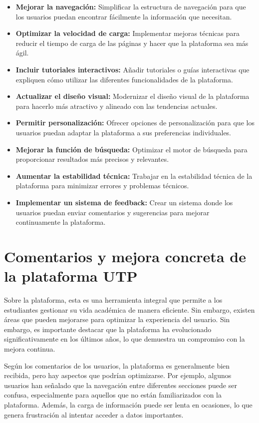 \documentclass{article}
\begin{document}
\begin{itemize}
  \item \textbf{Mejorar la navegación:} Simplificar la estructura de navegación para que los usuarios puedan encontrar fácilmente la información que necesitan.
  \item \textbf{Optimizar la velocidad de carga:} Implementar mejoras técnicas para reducir el tiempo de carga de las páginas y hacer que la plataforma sea más ágil.
  \item \textbf{Incluir tutoriales interactivos:} Añadir tutoriales o guías interactivas que expliquen cómo utilizar las diferentes funcionalidades de la plataforma.
  \item \textbf{Actualizar el diseño visual:} Modernizar el diseño visual de la plataforma para hacerlo más atractivo y alineado con las tendencias actuales.
  \item \textbf{Permitir personalización:} Ofrecer opciones de personalización para que los usuarios puedan adaptar la plataforma a sus preferencias individuales.
  \item \textbf{Mejorar la función de búsqueda:} Optimizar el motor de búsqueda para proporcionar resultados más precisos y relevantes.
  \item \textbf{Aumentar la estabilidad técnica:} Trabajar en la estabilidad técnica de la plataforma para minimizar errores y problemas técnicos.
  \item \textbf{Implementar un sistema de feedback:} Crear un sistema donde los usuarios puedan enviar comentarios y sugerencias para mejorar continuamente la plataforma.
\end{itemize}

\newpage

\section{Comentarios y mejora concreta de la plataforma UTP}

Sobre la plataforma, esta es una herramienta integral que permite a los estudiantes gestionar su vida académica de manera eficiente. Sin embargo, existen áreas que pueden mejorarse para optimizar la experiencia del usuario. Sin embargo, es importante destacar que la plataforma ha evolucionado significativamente en los últimos años, lo que demuestra un compromiso con la mejora continua.

Según los comentarios de los usuarios, la plataforma es generalmente bien recibida, pero hay aspectos que podrían optimizarse. Por ejemplo, algunos usuarios han señalado que la navegación entre diferentes secciones puede ser confusa, especialmente para aquellos que no están familiarizados con la plataforma. Además, la carga de información puede ser lenta en ocasiones, lo que genera frustración al intentar acceder a datos importantes.
\end{document}
